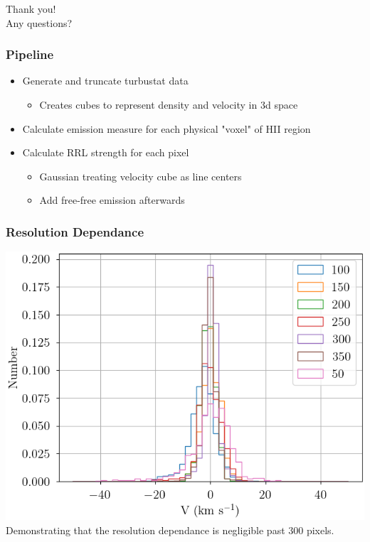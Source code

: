 \documentclass[aspectratio=169,compress]{beamer}
\newcommand\teeny{\fontsize{3pt}{3.6pt}\selectfont}
\begin{document}
\begin{frame}[noframenumbering]
  \centering
  \Huge
  Thank you!\\
  Any questions?
\end{frame}

\begin{frame}[noframenumbering]
  \frametitle{Pipeline}
  \begin{itemize}
    \item Generate and truncate turbustat data
      \begin{itemize}
        \item Creates cubes to represent density and velocity in 3d space
      \end{itemize}
    \item Calculate emission measure for each physical "voxel" of HII region
    \item Calculate RRL strength for each pixel
      \begin{itemize}
        \item Gaussian treating velocity cube as line centers
        \item Add free-free emission afterwards
      \end{itemize}
  \end{itemize}
\end{frame}

\begin{frame}[noframenumbering]
  \frametitle{Resolution Dependance}
  \centering
  \includegraphics[width=0.6\linewidth]{figures/vel_histogram.png}
  {\teeny\\ Demonstrating that the resolution dependance is negligible past 300 pixels.}
\end{frame}
\end{document}
